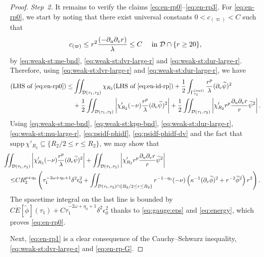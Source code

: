 \documentclass[10pt, reqno]{amsart}
\theoremstyle{definition}
\theoremstyle{remark}
\theoremstyle{conjecture}
\numberwithin{equation}{section}
\newcommand{\set}[1]{\{#1\}}
\newcommand{\rd}{\partial}
\newcommand{\0}{\emptyset}
\newcommand{\Gmm}{\Gamma}
\newcommand{\dlt}{\delta}
\newcommand{\eps}{\epsilon}
\newcommand{\kpp}{\kappa}
\newcommand{\lmb}{\lambda}
\newcommand{\omg}{\omega}
\newcommand{\calD}{\mathcal D}
\newcommand{\dur}{\nu}
\newcommand{\dvr}{\lmb}
\newcommand{\pfstep}[1]{\vspace{.5em} {\it \noindent #1.}}
\newcommand{\phibg}{\overline{\phi}}				%
\newcommand{\psibg}{\overline{\psi}}				%
\newcommand{\phidf}{\widetilde{\phi}}				%
\newcommand{\psidf}{\widetilde{\psi}}				%
\newcommand{\Abs}[1]{\left\vert #1 \right\vert}
\begin{document}
\begin{proof}
\pfstep{Step~2} It remains to verify the claims \eqref{eq:en-rp0}--\eqref{eq:en-rp3}. 
For \eqref{eq:en-rp0}, we start by noting that there exist universal constants $0 < c_{(\varpi)} < C$ such that
\begin{equation} \label{eq:c-varpi}
	c_{(\varpi)} \leq r^{2} \frac{(-\rd_{u} \rd_{v} r)}{\dvr} \leq C \quad \hbox{ in } \calD \cap \set{r \geq 20},
\end{equation}
by \eqref{eq:weak-st:me-bnd}, \eqref{eq:weak-st:dvr-large-r} and \eqref{eq:weak-st:dur-large-r}. Therefore, using \eqref{eq:weak-st:dvr-large-r} and \eqref{eq:weak-st:dur-large-r}, we have
\begin{align*}
(\hbox{LHS of \eqref{eq:en-rp0}})
\leq & \iint_{\calD(\tau_{1}, \tau_{2})} \chi_{R_{2}} (\hbox{LHS of \eqref{eq:en-id-rp}}) 
+ \frac{1}{2} \int_{\Gmm^{(out)}_{\tau_{1}}} \frac{r^{p}}{\dvr} (\rd_{v} \psidf)^{2} \\
& +\frac{1}{2} \iint_{\calD(\tau_{1}, \tau_{2})} \Abs{\chi_{R_{2}}' (-\dur) \frac{r^{p}}{\dvr} (\rd_{v} \psidf)^{2} }
 + \frac{1}{2} \iint_{\calD(\tau_{1}, \tau_{2})} \Abs{\chi_{R_{2}}' r^{p} \frac{\rd_{u} \rd_{v} r}{r} \psidf^{2}}.
\end{align*}
Using \eqref{eq:weak-st:me-bnd}, \eqref{eq:weak-st:kpp-bnd}, \eqref{eq:weak-st:dur-large-r}, \eqref{eq:weak-st:mu-large-r}, \eqref{eq:psidf-phidf}, \eqref{eq:psidf-phidf-dv} and the fact that $\mathrm{supp} \, \chi'_{R_{2}} \subseteq \set{R_{2}/2 \leq r \leq R_{2}}$, we may show that 
\begin{align*}
& \hskip-2em
 \iint_{\calD(\tau_{1}, \tau_{2})} \Abs{\chi_{R_{2}}' (-\dur) \frac{r^{p}}{\dvr} (\rd_{v} \psidf)^{2} }
 + \iint_{\calD(\tau_{1}, \tau_{2})} \Abs{\chi_{R_{2}}' r^{p} \frac{\rd_{u} \rd_{v} r}{r} \psidf^{2}} \\
 \leq & C R_{2}^{p+\eta_{0}} \left( \tau_{1}^{-2 \omg + \eta_{0} + 1} \dlt^{2} \eps_{0}^{2} 
 					+ \iint_{\calD(\tau_{1}, \tau_{2}) \cap \set{R_{2} /2 \leq r \leq R_{2}}} r^{-1-\eta_{0}} (-\dur) \left( \kpp^{-1} (\rd_{v} \phidf)^{2} + r^{-2} \phidf^{2} \right) r^{2} \right).
\end{align*}
The spacetime integral on the last line is bounded by $C \dot{E}[\phidf](\tau_{1})+C\tau_{1}^{-2 \omg + \eta_{0} + 1} \dlt^{2} \eps_{0}^{2}$ thanks to \eqref{eq:gauge:eps} and \eqref{eq:energy}, which proves \eqref{eq:en-rp0}.


Next, \eqref{eq:en-rp1} is a clear consequence of the Cauchy--Schwarz inequality, \eqref{eq:weak-st:dvr-large-r} and \eqref{eq:en-rp-G}.


\end{proof}
\end{document}
